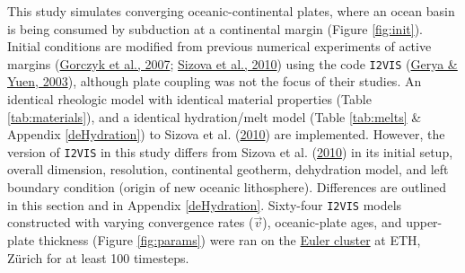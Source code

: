 This study simulates converging oceanic-continental plates, where an ocean basin is being consumed by subduction at a continental margin (Figure \ref{fig:init}). Initial conditions are modified from previous numerical experiments of active margins (\protect\hyperlink{ref-gorczyk2007}{Gorczyk et al., 2007}; \protect\hyperlink{ref-sizova2010}{Sizova et al., 2010}) using the code \texttt{I2VIS} (\protect\hyperlink{ref-gerya2003}{Gerya \& Yuen, 2003}), although plate coupling was not the focus of their studies. An identical rheologic model with identical material properties (Table \ref{tab:materials}), and a identical hydration/melt model (Table \ref{tab:melts} \& Appendix \ref{deHydration}) to Sizova et al. (\protect\hyperlink{ref-sizova2010}{2010}) are implemented. However, the version of \texttt{I2VIS} in this study differs from Sizova et al. (\protect\hyperlink{ref-sizova2010}{2010}) in its initial setup, overall dimension, resolution, continental geotherm, dehydration model, and left boundary condition (origin of new oceanic lithosphere). Differences are outlined in this section and in Appendix \ref{deHydration}. Sixty-four \texttt{I2VIS} models constructed with varying convergence rates (\(\vec{v}\)), oceanic-plate ages, and upper-plate thickness (Figure \ref{fig:params}) were ran on the \href{https://scicomp.ethz.ch/wiki/Euler}{Euler cluster} at ETH, Zürich for at least 100 timesteps.

